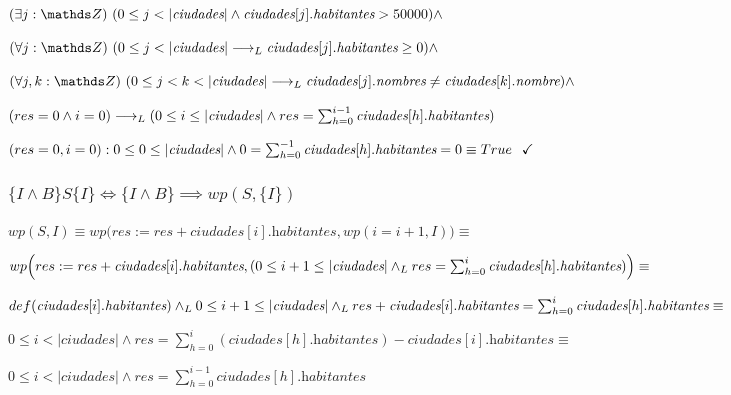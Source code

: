 \documentclass[10pt,a4paper]{article}
\begin{document}
$\noindent\existe[unalinea]{j}{\ent}{0 \leq j < |\textit{ciudades}| \land \textit{ciudades}[j].\textit{habitantes} > 50000} \land$


$\paraTodo[unalinea]{j}{\ent}{0 \leq j < |\textit{ciudades}| \implicaLuego \textit{ciudades}[j].\textit{habitantes} \geq 0} \land$

$\paraTodo[unalinea]{j,k}{\ent}{0 \leq j < k < |\textit{ciudades}|\implicaLuego \textit{ciudades}[j].\textit{nombres} \neq \textit{ciudades}[k].\textit{nombre}} \land$ 

$(res = 0 \land  i = 0) \longrightarrow _L (0 \leq i \leq |\textit{ciudades}| \land res = \sum_{h=0}^{i-1}\textit{ciudades}[h].\textit{habitantes})$

\vspace{2mm}

$(res = 0, i = 0): 0 \leq 0 \leq |\textit{ciudades}| \land 0 = \sum_{h=0}^{-1}\textit{ciudades}[h].\textit{habitantes} = 0 \equiv True \hspace*{2.5mm} \checkmark$

\subsubsection{\textbf{$\{I\land B\}S\{I\} \iff \{I\land B\} \implies wp(S,\{I\})$}}

$wp(S,{I}) \equiv wp\Big(res:= res + \textit{ciudades}[i].\textit{habitantes}, wp(i=i+1, {I})\Big) \equiv$

$wp\Big(res:= res + \textit{ciudades}[i].\textit{habitantes}, (0 \leq i+1 \leq |\textit{ciudades}| \land _L res = \sum_{h=0}^{i}\textit{ciudades}[h].\textit{habitantes})\Big) \equiv$

\vspace{0.5mm}

$def(\textit{ciudades}[i].\textit{habitantes}) \land _L 0 \leq i + 1 \leq |\textit{ciudades}| \land _L res + \textit{ciudades}[i].\textit{habitantes} = \sum_{h=0}^{i}\textit{ciudades}[h].\textit{habitantes} \equiv$

\vspace{0.5mm}

$0 \leq i < |\textit{ciudades}| \land res = \sum_{h=0}^{i}(\textit{ciudades}[h].\textit{habitantes}) - \textit{ciudades}[i].\textit{habitantes} \equiv$

\vspace{0.5mm}

$0 \leq i < |\textit{ciudades}| \land res = \sum_{h=0}^{i-1}\textit{ciudades}[h].\textit{habitantes}$
\end{document}
